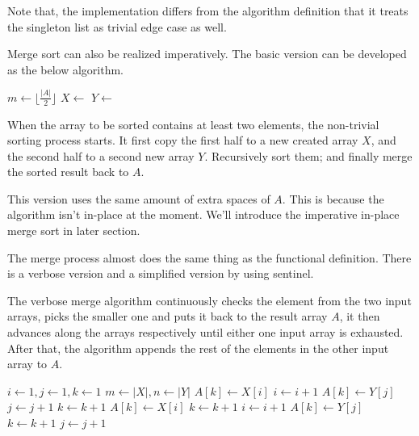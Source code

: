 \documentclass[b5paper]{article}
\begin{document}
Note that, the implementation differs from the algorithm definition that it treats the singleton
list as trivial edge case as well.

Merge sort can also be realized imperatively. The basic version can be developed as the below algorithm.

\begin{algorithmic}[1]
    \State $m \gets \lfloor \frac{|A|}{2} \rfloor$
    \State $X \gets$ 
    \State $Y \gets$ 
    \State {}
    \State {}
    \State {}
  \EndIf
\EndProcedure
\end{algorithmic}

When the array to be sorted contains at least two elements, the non-trivial sorting process starts.
It first copy the first half to a new created array $X$, and the second half to a second new array $Y$.
Recursively sort them; and finally merge the sorted result back to $A$.

This version uses the same amount of extra spaces of $A$. This is because the  algorithm
isn't in-place at the moment. We'll introduce the imperative in-place merge sort in later section.

The merge process almost does the same thing as the functional definition. There is a verbose version
and a simplified version by using sentinel.

The verbose merge algorithm continuously checks the element from the two input arrays, picks the smaller one
and puts it back to the result array $A$, it then advances along the arrays respectively until either
one input array is exhausted. After that, the algorithm appends the rest of the elements in the other
input array to $A$.

\begin{algorithmic}[1]
  \State $i \gets 1, j\gets 1, k\gets 1$
  \State $m \gets |X|, n \gets |Y|$
      \State $A[k] \gets X[i]$
      \State $i \gets i + 1$
    \Else
      \State $A[k] \gets Y[j]$
      \State $j \gets j + 1$
    \EndIf
    \State $k \gets k + 1$
  \EndWhile
    \State $A[k] \gets X[i]$
    \State $k \gets k + 1$
    \State $i \gets i + 1$
  \EndWhile
    \State $A[k] \gets Y[j]$
    \State $k \gets k + 1$
    \State $j \gets j + 1$
  \EndWhile
\EndProcedure
\end{algorithmic}
\end{document}
